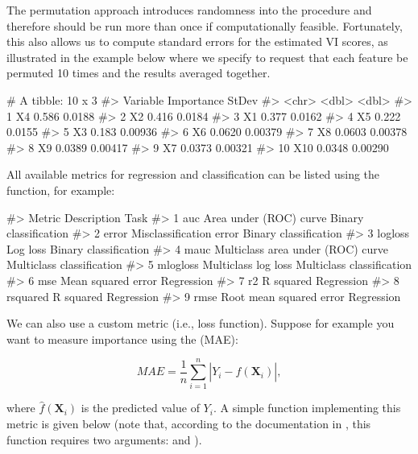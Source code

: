 The permutation approach introduces randomness into the procedure and therefore should be run more than once if computationally feasible. Fortunately, this also allows us to compute standard errors for the estimated VI scores, as illustrated in the example below where we specify  to request that each feature be permuted 10 times and the results averaged together.

\begin{example}
# A tibble: 10 x 3
#>    Variable Importance   StDev
#>    <chr>         <dbl>   <dbl>
#>  1 X4           0.586  0.0188 
#>  2 X2           0.416  0.0184 
#>  3 X1           0.377  0.0162 
#>  4 X5           0.222  0.0155 
#>  5 X3           0.183  0.00936
#>  6 X6           0.0620 0.00379
#>  7 X8           0.0603 0.00378
#>  8 X9           0.0389 0.00417
#>  9 X7           0.0373 0.00321
#> 10 X10          0.0348 0.00290
\end{example}

All available metrics for regression and classification can be listed using the  function, for example:

\begin{example}
#>     Metric                       Description                      Task
#> 1      auc            Area under (ROC) curve     Binary classification
#> 2    error           Misclassification error     Binary classification
#> 3  logloss                          Log loss     Binary classification
#> 4     mauc Multiclass area under (ROC) curve Multiclass classification
#> 5 mlogloss               Multiclass log loss Multiclass classification
#> 6      mse                Mean squared error                Regression
#> 7       r2                         R squared                Regression
#> 8 rsquared                         R squared                Regression
#> 9     rmse           Root mean squared error                Regression
\end{example}

We can also use a custom metric (i.e., loss function). Suppose for example you want to measure importance using the  (MAE): 

\begin{equation}
  MAE = \frac{1}{n}\sum_{i = 1}^n\left|Y_i - \widehat{f}\left(\boldsymbol{X}_i\right)\right|,
\end{equation}

where $\widehat{f}\left(\boldsymbol{X}_i\right)$ is the predicted value of $Y_i$. A simple function implementing this metric is given below (note that, according to the documentation in , this function requires two arguments:  and ).

